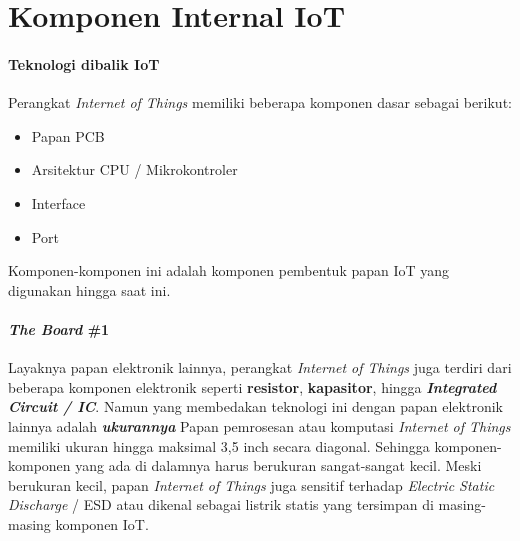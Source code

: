 

\section{Komponen Internal IoT}

\begin{frame}{\insertsectionhead}
	\framesubtitle{Teknologi dibalik IoT}
	\justifying
	Perangkat \textit{Internet of Things} memiliki beberapa komponen dasar sebagai berikut:
	\begin{itemize}
		\item Papan PCB
		\item Arsitektur CPU / Mikrokontroler
		\item Interface
		\item Port
	\end{itemize}
	\vfill
	Komponen-komponen ini adalah komponen pembentuk papan IoT yang digunakan hingga saat ini.
\end{frame}

\begin{frame}{\insertsectionhead}
	\framesubtitle{\textit{The Board} \#1}
	\justifying
	Layaknya papan elektronik lainnya, perangkat \textit{Internet of Things} juga terdiri dari beberapa komponen elektronik seperti \textbf{resistor}, \textbf{kapasitor}, hingga \textbf{\textit{Integrated Circuit / IC}}. Namun yang membedakan teknologi ini dengan papan elektronik lainnya adalah \textbf{\textit{ukurannya}}
	\vfill
	Papan pemrosesan atau komputasi \textit{Internet of Things} memiliki ukuran hingga maksimal 3,5 inch secara diagonal. Sehingga komponen-komponen yang ada di dalamnya harus berukuran sangat-sangat kecil.
	\vfill
	Meski berukuran kecil, papan \textit{Internet of Things} juga sensitif terhadap \textit{Electric Static Discharge} / ESD atau dikenal sebagai listrik statis yang tersimpan di masing-masing komponen IoT.
\end{frame}

